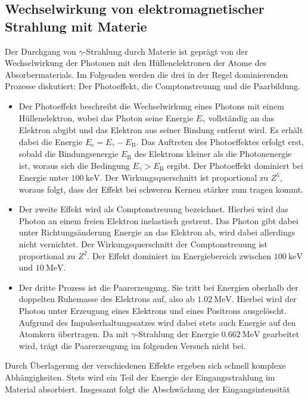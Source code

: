 \subsection{Wechselwirkung von elektromagnetischer Strahlung mit Materie}
Der Durchgang von $\gamma$-Strahlung durch Materie ist geprägt von der
Wechselwirkung der Photonen mit den Hüllenelektronen der Atome des
Absorbermaterials. Im Folgenden werden die drei in der Regel dominierenden
Prozesse diskutiert: Der Photoeffekt, die Comptonstreuung und die Paarbildung.
\begin{itemize}
  \item Der Photoeffekt beschreibt die Wechselwirkung eines Photons mit einem
  Hüllenelektron, wobei das Photon seine Energie $E_{\gamma}$ vollständig an
  das Elektron abgibt und das Elektron aus seiner Bindung  entfernt wird. Es
  erhält dabei die Energie $E_\text{e}=E_{\gamma}-E_\text{B}$. Das Auftreten
  des Photoeffektes erfolgt erst, sobald die Bindungsenergie $E_\text{B}$ des
  Elektrons kleiner als die Photonenergie ist, woraus sich die Bedingung
  $E_{\gamma}>E_\text{B}$ ergibt. Der Photoeffekt dominiert bei Energie unter
  $\SI{100}{\kilo\electronvolt}$. Der Wirkungsquerschnitt ist proportional zu
  $Z^5$, woraus folgt, dass der Effekt bei schweren Kernen stärker zum tragen
  kommt.
  \item Der zweite Effekt wird als Comptonstreuung bezeichnet. Hierbei wird das
  Photon an einem freien Elektron inelastisch gestreut. Das Photon gibt dabei
  unter Richtungsänderung Energie an das Elektron ab, wird dabei allerdings
  nicht vernichtet. Der Wirkungsquerschnitt der Comptonstreuung ist
  proportional zu $Z^2$. Der Effekt dominiert im Energiebereich zwischen
  $\SI{100}{\kilo\electronvolt}$ und $\SI{10}{\mega\electronvolt}$.
  \item Der dritte Prozess ist die Paarerzeugung. Sie tritt bei Energien
  oberhalb der doppelten Ruhemasse des Elektrons auf, also ab
  $\SI{1.02}{\mega\electronvolt}$. Hierbei wird der Photon unter Erzeugung eines
  Elektrons und eines Positrons ausgelöscht. Aufgrund des
  Impulserhaltungssatzes wird dabei stets auch Energie auf den Atomkern
  übertragen. Da mit $\gamma$-Strahlung der Energie
  $\SI{0.662}{\mega\electronvolt}$ gearbeitet wird, trägt die Paarerzeugung im
  folgenden Versuch nicht bei.
\end{itemize}
Durch Überlagerung der verschiedenen Effekte ergeben sich schnell komplexe
Abhängigkeiten. Stets wird ein Teil der Energie der Eingangsstrahlung im
Material absorbiert. Insgesamt folgt die Abschwächung der Eingangsintensität
